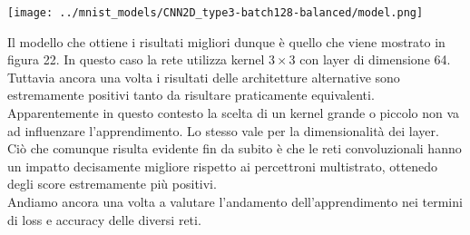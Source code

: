 \documentclass[12pt]{article}
\begin{document}
\begin{multicols}{3}
    \noindent
    \begin{minipage}{\linewidth}
        \centering
        \texttt{[image: ../mnist\_models/CNN2D\_type3-batch128-balanced/model.png]}
        \label{fig:cc}
    \end{minipage}
    \bigskip

\end{multicols}

Il modello che ottiene i risultati migliori dunque è quello che viene mostrato
in figura 22. In questo caso la rete utilizza kernel $3\times3$ con layer di dimensione 64.\\

Tuttavia ancora una volta i risultati delle architetture alternative sono estremamente
positivi tanto da risultare praticamente equivalenti.\\

Apparentemente in questo contesto la scelta di un kernel grande o piccolo
non va ad influenzare l'apprendimento. Lo stesso vale per la dimensionalità
dei layer.\\

Ciò che comunque risulta evidente fin da subito è che le reti convoluzionali
hanno un impatto decisamente migliore rispetto ai percettroni multistrato,
ottenedo degli score estremamente più positivi.\\

Andiamo ancora una volta a valutare l'andamento dell'apprendimento nei
termini di loss e accuracy delle diversi reti.
\end{document}
